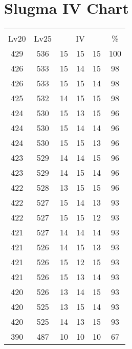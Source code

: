 \documentclass{article}%
\begin{document}
%
\normalsize%
\section{Slugma IV Chart}%
\label{sec:Slugma IV Chart}%
\renewcommand{\arraystretch}{1.5}%
\begin{tabular}{|c|c|c|c|c|c|}%
\hline%
\multicolumn{6}{|c|}{\textcolor{white}{ 
\linebreak{Slugma}
}%
\cellcolor{black}}\\%
\multicolumn{1}{|c}{Lv20}&\multicolumn{1}{c|}{Lv25}&\multicolumn{3}{c|}{IV}&\multicolumn{1}{|c|}{\%}\\%
\hline%
\rowcolor{color100}%
429&536&15&15&15&100\\%
\hline%
\rowcolor{color98}%
426&533&15&14&15&98\\%
\hline%
\rowcolor{color98}%
426&533&15&15&14&98\\%
\hline%
\rowcolor{color98}%
425&532&14&15&15&98\\%
\hline%
\rowcolor{color96}%
424&530&15&13&15&96\\%
\hline%
\rowcolor{color96}%
424&530&15&14&14&96\\%
\hline%
\rowcolor{color96}%
424&530&15&15&13&96\\%
\hline%
\rowcolor{color96}%
423&529&14&14&15&96\\%
\hline%
\rowcolor{color96}%
423&529&14&15&14&96\\%
\hline%
\rowcolor{color96}%
422&528&13&15&15&96\\%
\hline%
\rowcolor{color93}%
422&527&15&14&13&93\\%
\hline%
\rowcolor{color93}%
422&527&15&15&12&93\\%
\hline%
\rowcolor{color93}%
421&527&14&14&14&93\\%
\hline%
\rowcolor{color93}%
421&526&14&15&13&93\\%
\hline%
\rowcolor{color93}%
421&526&15&12&15&93\\%
\hline%
\rowcolor{color93}%
421&526&15&13&14&93\\%
\hline%
\rowcolor{color93}%
420&526&13&14&15&93\\%
\hline%
\rowcolor{color93}%
420&525&13&15&14&93\\%
\hline%
\rowcolor{color93}%
420&525&14&13&15&93\\%
\hline%
\rowcolor{color91}%
390&487&10&10&10&67\\%
\end{tabular}

%
\end{document}
